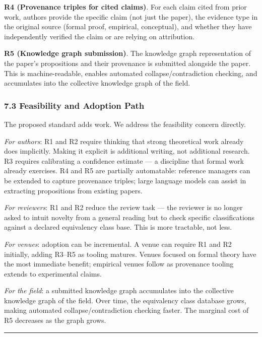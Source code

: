 \documentclass[
]{article}
\begin{document}
\textbf{R4 (Provenance triples for cited claims)}. For each claim cited
from prior work, authors provide the specific claim (not just the
paper), the evidence type in the original source (formal proof,
empirical, conceptual), and whether they have independently verified the
claim or are relying on attribution.

\textbf{R5 (Knowledge graph submission)}. The knowledge graph
representation of the paper's propositions and their provenance is
submitted alongside the paper. This is machine-readable, enables
automated collapse/contradiction checking, and accumulates into the
collective knowledge graph of the field.

\subsubsection{7.3 Feasibility and Adoption
Path}\label{feasibility-and-adoption-path}

The proposed standard adds work. We address the feasibility concern
directly.

\emph{For authors}: R1 and R2 require thinking that strong theoretical
work already does implicitly. Making it explicit is additional writing,
not additional research. R3 requires calibrating a confidence estimate
--- a discipline that formal work already exercises. R4 and R5 are
partially automatable: reference managers can be extended to capture
provenance triples; large language models can assist in extracting
propositions from existing papers.

\emph{For reviewers}: R1 and R2 reduce the review task --- the reviewer
is no longer asked to intuit novelty from a general reading but to check
specific classifications against a declared equivalency class base. This
is more tractable, not less.

\emph{For venues}: adoption can be incremental. A venue can require R1
and R2 initially, adding R3--R5 as tooling matures. Venues focused on
formal theory have the most immediate benefit; empirical venues follow
as provenance tooling extends to experimental claims.

\emph{For the field}: a submitted knowledge graph accumulates into the
collective knowledge graph of the field. Over time, the equivalency
class database grows, making automated collapse/contradiction checking
faster. The marginal cost of R5 decreases as the graph grows.

\begin{center}\rule{0.5\linewidth}{0.5pt}\end{center}
\end{document}
